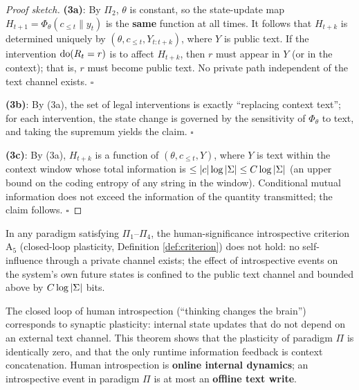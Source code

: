 \begin{proof}[Proof sketch]
\textbf{(3a)}: By $\Pi_2$, $\theta$ is constant, so the state-update map
$H_{t+1} = \Phi_\theta(c_{\le t}\| y_t)$ is the \textbf{same} function at all times. It follows that
$H_{t+k}$ is determined uniquely by $(\theta, c_{\le t}, Y_{t:t+k})$, where $Y$ is public
text. If the intervention $\operatorname{do}(R_t = r)$ is to affect $H_{t+k}$, then $r$ must appear in
$Y$ (or in the context); that is, $r$ must become public text. No private path independent of
the text channel exists. $\square$

\textbf{(3b)}: By (3a), the set of legal interventions is exactly ``replacing context text'';
for each intervention, the state change is governed by the sensitivity of $\Phi_\theta$ to
text, and taking the supremum yields the claim. $\square$

\textbf{(3c)}: By (3a), $H_{t+k}$ is a function of $(\theta, c_{\le t}, Y)$, where $Y$ is text
within the context window whose total information is $\le \left\lvert c \right\rvert \log\left\lvert \Sigma \right\rvert \le C
\log\left\lvert \Sigma \right\rvert$ (an upper bound on the coding entropy of any string in the window).
Conditional mutual information does not exceed the information of the quantity transmitted;
the claim follows. $\square$
\end{proof}

\begin{corollary}\label{cor:a5}
In any paradigm satisfying $\Pi_1$--$\Pi_4$, the human-significance introspective criterion
$\mathrm{A}_5$ (closed-loop plasticity, Definition \ref{def:criterion}) does not hold: no
self-influence through a private channel exists; the effect of introspective events on the
system's own future states is confined to the public text channel and bounded above by
$C\log\left\lvert \Sigma \right\rvert$ bits.
\end{corollary}

\begin{remark}
The closed loop of human introspection (``thinking changes the brain'') corresponds to synaptic
plasticity: internal state updates that do not depend on an external text channel. This
theorem shows that the plasticity of paradigm $\Pi$ is identically
zero\cite{joudaki-2025-plasticity}, and that the only runtime information feedback is context
concatenation. Human introspection is \textbf{online internal dynamics}; an introspective
event in paradigm $\Pi$ is at most an \textbf{offline text write}.
\end{remark}

